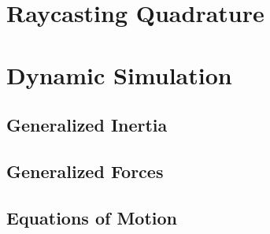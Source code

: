 \section{Raycasting Quadrature}
\section{Dynamic Simulation}
\subsection{Generalized Inertia}
\subsection{Generalized Forces}
\subsection{Equations of Motion}

%

